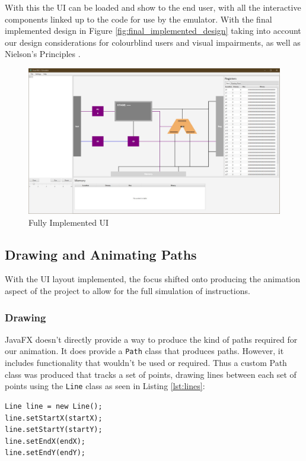 With this the \ac{UI} can be loaded and show to the end user, with all the interactive components linked up to the code for use by the emulator. With the final implemented design in Figure \ref{fig:final_implemented_design} taking into account our design considerations for colourblind users and visual impairments, as well as Nielson's Principles \cite{nielsen_2020_10}.

\begin{figure}[H]
    \centering
    \includegraphics[width=\textwidth]{dissertation/DATA/final_design.jpg}
    \caption{Fully Implemented \ac{UI}}
    \label{fig:full_impl_ui}
\end{figure}

\subsection{Drawing and Animating Paths}\label{sec:paths}
With the \ac{UI} layout implemented, the focus shifted onto producing the animation aspect of the project to allow for the full simulation of instructions.

\subsubsection{Drawing}
JavaFX \cite{sunmicrosystems_2022_javafx} doesn't directly provide a way to produce the kind of paths required for our animation. It does provide a \texttt{Path} class that produces paths. However, it includes functionality that wouldn't be used or required. Thus a custom Path class was produced that tracks a set of points, drawing lines between each set of points using the \texttt{Line} class as seen in Listing \ref{lst:lines}:
\begin{lstlisting}[caption={Example usage of the Line class}, label=lst:lines]
Line line = new Line();
line.setStartX(startX);
line.setStartY(startY);
line.setEndX(endX);
line.setEndY(endY);
\end{lstlisting}

